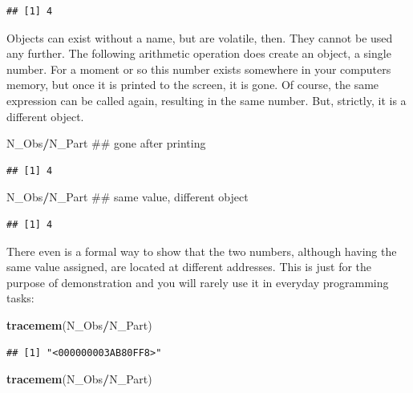 \documentclass[]{svmono}
\newenvironment{Shaded}{\begin{snugshade}}{\end{snugshade}}
\newcommand{\KeywordTok}[1]{\textcolor[rgb]{0.13,0.29,0.53}{\textbf{#1}}}
\newcommand{\OperatorTok}[1]{\textcolor[rgb]{0.81,0.36,0.00}{\textbf{#1}}}
\newcommand{\NormalTok}[1]{#1}
\begin{document}
\begin{verbatim}
## [1] 4
\end{verbatim}

Objects can exist without a name, but are volatile, then. They cannot be
used any further. The following arithmetic operation does create an
object, a single number. For a moment or so this number exists somewhere
in your computers memory, but once it is printed to the screen, it is
gone. Of course, the same expression can be called again, resulting in
the same number. But, strictly, it is a different object.

\begin{Shaded}
\begin{Highlighting}[]
\NormalTok{N_Obs}\OperatorTok{/}\NormalTok{N_Part ## gone after printing}
\end{Highlighting}
\end{Shaded}

\begin{verbatim}
## [1] 4
\end{verbatim}

\begin{Shaded}
\begin{Highlighting}[]
\NormalTok{N_Obs}\OperatorTok{/}\NormalTok{N_Part ## same value, different object}
\end{Highlighting}
\end{Shaded}

\begin{verbatim}
## [1] 4
\end{verbatim}

There even is a formal way to show that the two numbers, although having
the same value assigned, are located at different addresses. This is
just for the purpose of demonstration and you will rarely use it in
everyday programming tasks:

\begin{Shaded}
\begin{Highlighting}[]
\KeywordTok{tracemem}\NormalTok{(N_Obs}\OperatorTok{/}\NormalTok{N_Part)}
\end{Highlighting}
\end{Shaded}

\begin{verbatim}
## [1] "<000000003AB80FF8>"
\end{verbatim}

\begin{Shaded}
\begin{Highlighting}[]
\KeywordTok{tracemem}\NormalTok{(N_Obs}\OperatorTok{/}\NormalTok{N_Part)}
\end{Highlighting}
\end{Shaded}
\end{document}
